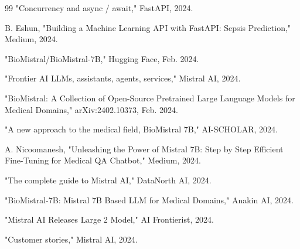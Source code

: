 \documentclass[conference]{IEEEtran}
\begin{document}
\begin{thebibliography}{99}
"Concurrency and async / await," FastAPI, 2024.

B. Eshun, "Building a Machine Learning API with FastAPI: Sepsis Prediction," Medium, 2024.

"BioMistral/BioMistral-7B," Hugging Face, Feb. 2024.

"Frontier AI LLMs, assistants, agents, services," Mistral AI, 2024.

"BioMistral: A Collection of Open-Source Pretrained Large Language Models for Medical Domains," arXiv:2402.10373, Feb. 2024.

"A new approach to the medical field, BioMistral 7B," AI-SCHOLAR, 2024.

A. Nicoomanesh, "Unleashing the Power of Mistral 7B: Step by Step Efficient Fine-Tuning for Medical QA Chatbot," Medium, 2024.

"The complete guide to Mistral AI," DataNorth AI, 2024.

"BioMistral-7B: Mistral 7B Based LLM for Medical Domains," Anakin AI, 2024.

"Mistral AI Releases Large 2 Model," AI Frontierist, 2024.

"Customer stories," Mistral AI, 2024.

\end{thebibliography}
\end{document}
